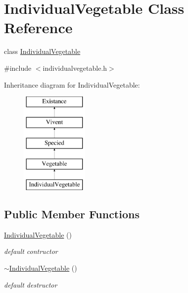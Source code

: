 \hypertarget{classIndividualVegetable}{
\section{IndividualVegetable Class Reference}
\label{classIndividualVegetable}
}


class \hyperlink{classIndividualVegetable}{IndividualVegetable}  




{\ttfamily \#include $<$individualvegetable.h$>$}

Inheritance diagram for IndividualVegetable:\begin{figure}[H]
\begin{center}
\leavevmode
\includegraphics[height=5.000000cm]{classIndividualVegetable}
\end{center}
\end{figure}
\subsection*{Public Member Functions}
\begin{DoxyCompactItemize}
\item 
\hypertarget{classIndividualVegetable_a4c6d823618f7f9569b465d58a0fbf6be}{
\hyperlink{classIndividualVegetable_a4c6d823618f7f9569b465d58a0fbf6be}{IndividualVegetable} ()}
\label{classIndividualVegetable_a4c6d823618f7f9569b465d58a0fbf6be}

\begin{DoxyCompactList}\small\item\em default contructor \end{DoxyCompactList}\item 
\hypertarget{classIndividualVegetable_a6015588a2374d86b69a85bb269b3b2de}{
\hyperlink{classIndividualVegetable_a6015588a2374d86b69a85bb269b3b2de}{$\sim$IndividualVegetable} ()}
\label{classIndividualVegetable_a6015588a2374d86b69a85bb269b3b2de}

\begin{DoxyCompactList}\small\item\em default destructor \end{DoxyCompactList}\end{DoxyCompactItemize}
